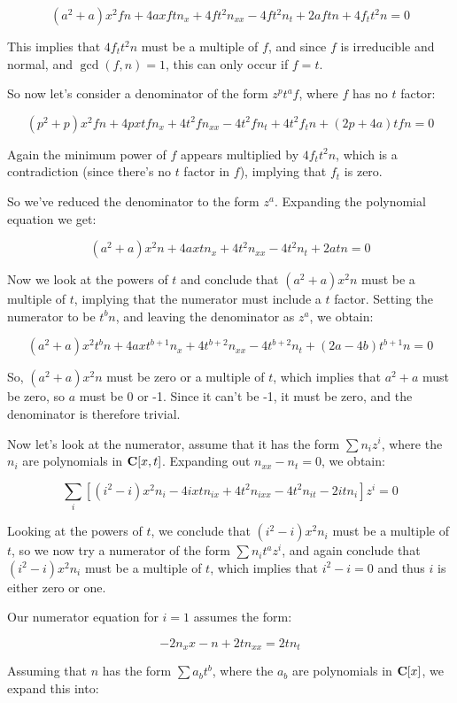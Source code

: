 \documentclass{article}
\newcommand{\C}{\ensuremath{{\bf C}}}
\begin{document}
$$(a^{2} +a)x^{2}fn +4axftn_x +4ft^{2}n_{xx} -4ft^{2}n_t +2aftn +4f_tt^{2}n = 0$$

This implies that $4f_tt^{2}n$ must be a multiple of $f$, and since $f$ is irreducible and normal,
and $\gcd(f,n)=1$, this can only occur if $f=t$.

So now let's consider a denominator of the form $z^p t^a f$, where $f$ has no $t$ factor:

$$(p^{2} +p)x^{2}fn +4pxtfn_x +4t^{2}fn_{xx} -4t^{2}fn_t +4t^{2}f_tn +(2p +4a)tfn = 0$$

Again the minimum power of $f$ appears multiplied by $4f_tt^{2}n$, which is a contradiction
(since there's no $t$ factor in $f$), implying that $f_t$ is zero.

So we've reduced the denominator to the form $z^a$.  Expanding the polynomial equation we get:

$$(a^{2} +a)x^{2}n +4axtn_x +4t^{2}n_{xx} -4t^{2}n_t +2atn = 0$$

Now we look at the powers of $t$ and conclude that $(a^{2}
+a)x^{2}n$ must be a multiple of $t$, implying that the numerator
must include a $t$ factor.  Setting the numerator to be $t^b n$, and
leaving the denominator as $z^a$, we obtain:

$$(a^{2} +a)x^{2}t^{b}n +4axt^{b +1}n_x +4t^{b +2}n_{xx} -4t^{b +2}n_t +(2a -4b)t^{b +1}n = 0$$

So, $(a^{2} +a)x^{2}n$ must be zero or a multiple of $t$, which implies that $a^2+a$ must be
zero, so $a$ must be 0 or -1.  Since it can't be -1, it must be zero,
and the denominator is therefore trivial.

Now let's look at the numerator, assume that it has the form $\sum n_i z^i$, where the $n_i$
are polynomials in $\C[x,t]$.  Expanding out $n_{xx} - n_t = 0$, we obtain:

$$\sum_i \left[ (i^{2} -i)x^{2}n_i -4ixtn_{ix} +4t^{2}n_{ixx} -4t^{2}n_{it} -2itn_i \right] z^i = 0$$

Looking at the powers of $t$, we conclude that $(i^{2} -i)x^{2}n_i$ must be a multiple
of $t$, so we now try a numerator of the form $\sum n_i t^a z^i$, and again
conclude that $(i^2-i) x^2 n_i$ must be a multiple of $t$, which implies that $i^2-i=0$
and thus $i$ is either zero or one.

Our numerator equation for $i=1$ assumes the form:

$$-2n_x x - n + 2 t n_{xx} = 2 t n_t$$

Assuming that $n$ has the form $\sum a_b t^b$, where the $a_b$ are polynomials in
$\C[x]$, we expand this into:
\end{document}
